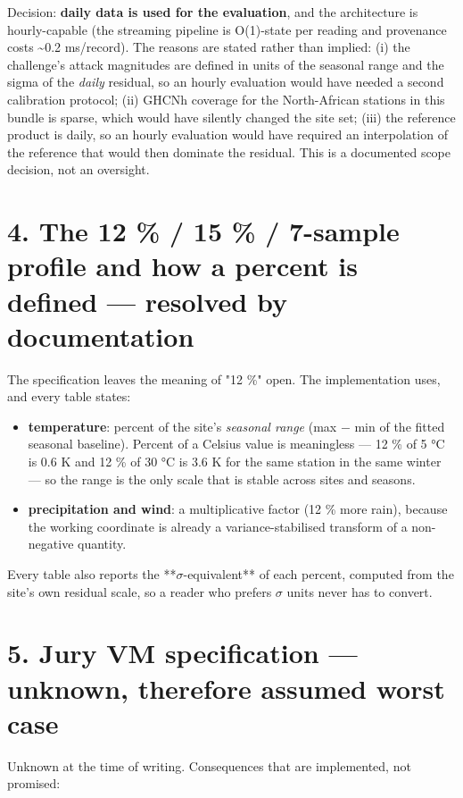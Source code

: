 \documentclass[10pt,a4paper]{article}
\begin{document}
Decision: \textbf{daily data is used for the evaluation}, and the architecture is hourly-\allowbreak{}capable (the streaming pipeline is O(1)-\allowbreak{}state per reading and provenance costs \textasciitilde{}0.2 ms/\allowbreak{}record). The reasons are stated rather than implied: (i) the challenge's attack magnitudes are defined in units of the seasonal range and the sigma of the \emph{daily} residual, so an hourly evaluation would have needed a second calibration protocol; (ii) GHCNh coverage for the North-\allowbreak{}African stations in this bundle is sparse, which would have silently changed the site set; (iii) the reference product is daily, so an hourly evaluation would have required an interpolation of the reference that would then dominate the residual. This is a documented scope decision, not an oversight.

\section*{4. The 12 \% /\allowbreak{} 15 \% /\allowbreak{} 7-\allowbreak{}sample profile and how a percent is defined — resolved by documentation}
The specification leaves the meaning of "12 \%" open. The implementation uses, and every table states:

\begin{itemize}
\item \textbf{temperature}: percent of the site's \emph{seasonal range} (max $-$ min of the fitted
seasonal baseline). Percent of a Celsius value is meaningless — 12 \% of 5 °C is 0.6 K and 12 \% of 30 °C is 3.6 K for the same station in the same winter — so the range is the only scale that is stable across sites and seasons.

\item \textbf{precipitation and wind}: a multiplicative factor (12 \% more rain), because
the working coordinate is already a variance-\allowbreak{}stabilised transform of a non-\allowbreak{}negative quantity.

\end{itemize}

Every table also reports the **$\sigma$-\allowbreak{}equivalent** of each percent, computed from the site's own residual scale, so a reader who prefers $\sigma$ units never has to convert.

\section*{5. Jury VM specification — unknown, therefore assumed worst case}
Unknown at the time of writing. Consequences that are implemented, not promised:
\end{document}
